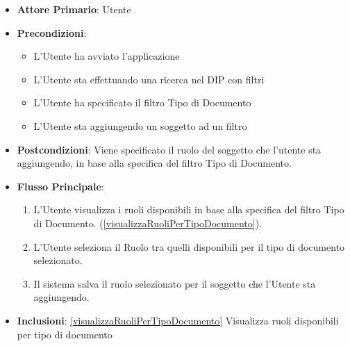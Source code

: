 \begin{itemize}
      \item \textbf{Attore Primario}: Utente
      \item \textbf{Precondizioni}: 
      \begin{itemize}
            \item L'Utente ha avviato l'applicazione
            \item L'Utente sta effettuando una ricerca nel DIP con filtri
            \item L'Utente ha specificato il filtro Tipo di Documento
            \item L'Utente sta aggiungendo un soggetto ad un filtro
      \end{itemize}
      \item \textbf{Postcondizioni}: Viene specificato il ruolo del soggetto che l'utente sta aggiungendo, in base alla specifica del filtro Tipo di Documento.
      \item \textbf{Flusso Principale}:
            \begin{enumerate}
                  \item L'Utente visualizza i ruoli disponibili in base alla specifica del filtro Tipo di Documento. (\ref{visualizzaRuoliPerTipoDocumento}).
                  \item L'Utente seleziona il Ruolo tra quelli disponibili per il tipo di documento selezionato.
                  \item Il sistema salva il ruolo selezionato per il soggetto che l'Utente sta aggiungendo.
            \end{enumerate}
      \item \textbf{Inclusioni}: \ref{visualizzaRuoliPerTipoDocumento} Visualizza ruoli disponibili per tipo di documento
\end{itemize}

